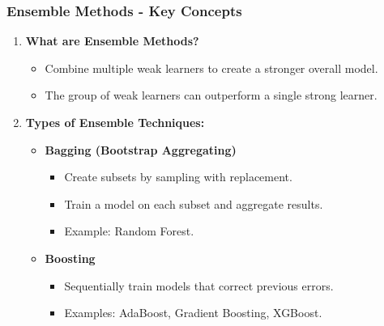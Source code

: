 \documentclass[aspectratio=169]{beamer}
\begin{document}
\begin{frame}[fragile]
    \frametitle{Ensemble Methods - Key Concepts}
    \begin{enumerate}
        \item \textbf{What are Ensemble Methods?}
            \begin{itemize}
                \item Combine multiple weak learners to create a stronger overall model.
                \item The group of weak learners can outperform a single strong learner.
            \end{itemize}
        \item \textbf{Types of Ensemble Techniques:}
            \begin{itemize}
                \item \textbf{Bagging (Bootstrap Aggregating)}
                    \begin{itemize}
                        \item Create subsets by sampling with replacement.
                        \item Train a model on each subset and aggregate results.
                        \item Example: Random Forest.
                    \end{itemize}
                \item \textbf{Boosting}
                    \begin{itemize}
                        \item Sequentially train models that correct previous errors.
                        \item Examples: AdaBoost, Gradient Boosting, XGBoost.
                    \end{itemize}
            \end{itemize}
    \end{enumerate}
\end{frame}
\end{document}
